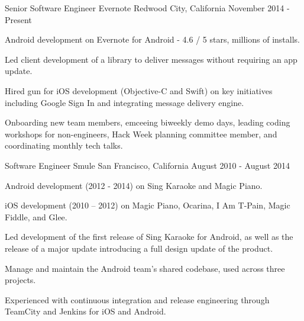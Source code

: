 

\begin{cventries}

  \cventry
    {Senior Software Engineer} %
    {Evernote} %
    {Redwood City, California} %
    {November 2014 - Present} %
    {
      \begin{cvitems} %
        \item {Android development on Evernote for Android - 4.6 / 5 stars, millions of installs.}
        \item {Led client development of a library to deliver messages without requiring an app update.}
        \item {Hired gun for iOS development (Objective-C and Swift) on key initiatives including Google Sign In and integrating message delivery engine.}
		\item {Onboarding new team members, emceeing biweekly demo days, leading coding workshops for non-engineers, Hack Week planning committee member, and coordinating monthly tech talks.}
      \end{cvitems}
    }
    
  \cventry
    {Software Engineer} %
    {Smule} %
    {San Francisco, California} %
    {August 2010 - August 2014} %
    {
      \begin{cvitems} %
        \item {Android development (2012 - 2014) on Sing Karaoke and Magic Piano.}
        \item {iOS development (2010 – 2012) on Magic Piano, Ocarina, I Am T-Pain, Magic Fiddle, and Glee.}
        \item {Led development of the first release of Sing Karaoke for Android, as well as the release of a major update introducing a full design update of the product.}
        \item {Manage and maintain the Android team’s shared codebase, used across three projects.}
        \item {Experienced with continuous integration and release engineering through TeamCity and Jenkins for iOS and Android.}
      \end{cvitems}
    }
    

\end{cventries}

